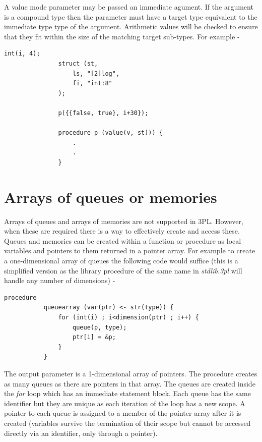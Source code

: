            A value mode parameter may be passed an immediate agument. If the
            argument is a compound type then the parameter must have a target type
            equivalent to the immediate type type of the argument. Arithmetic
            values will be checked to ensure that they fit within the size of
            the matching target sub-types. For example -
            
            \begin{lstlisting}[gobble=12, language=threepl]
               int(i, 4);  
               struct (st,
                   ls, "[2]log",
                   fi, "int:8"
               );

               p({{false, true}, i+30});

               procedure p (value(v, st))) {
                   .
                   .
               }
            \end{lstlisting}


    \section{Arrays of queues or memories}

        Arrays of queues and arrays of memories are not supported in 3PL. However,
        when these are required there is a way to effectively create and access
        these. Queues and memories can be created within a function or procedure
        as local variables and pointers to them returned in a pointer array. For
        example to create a one-dimensional array of queues the following code
        would suffice (this is a simplified version as the library procedure of
        the same name in {\em stdlib.3pl} will handle any number of dimensions) -
        \begin{lstlisting}[gobble=8, language=threepl]
           procedure
           queuearray (var(ptr) <- str(type)) {
               for (int(i) ; i<dimension(ptr) ; i++) {
                   queue(p, type);
                   ptr[i] = &p;
               }
           }
        \end{lstlisting}
        The output parameter is a 1-dimensional array of pointers. The
        procedure creates as many queues as there are pointers in that array.
        The queues are created inside the {\em for} loop which has an
        immediate statement block. Each queue has the same identifier but they
        are unique as each iteration of the loop has a new scope. A pointer
        to each queue is assigned to a member of the pointer array after it is
        created (variables survive the termination of their scope but cannot
        be accessed directly via an identifier, only through a pointer).

